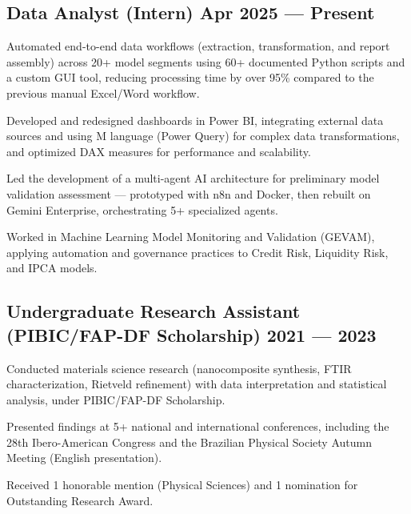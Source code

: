 \justifying

\subsection{{Data Analyst (Intern)} \hfill Apr 2025 --- Present}
\vspace{0.5em}
\begin{zitemize}
\setlength{\itemsep}{0.6em}
    \item Automated end-to-end data workflows (extraction, transformation, and report assembly) across 20+ model segments using 60+ documented Python scripts and a custom GUI tool, reducing processing time by over 95\% compared to the previous manual Excel/Word workflow.
    \item Developed and redesigned dashboards in Power BI, integrating external data sources and using M language (Power Query) for complex data transformations, and optimized DAX measures for performance and scalability.
    \item Led the development of a multi-agent AI architecture for preliminary model validation assessment — prototyped with n8n and Docker, then rebuilt on Gemini Enterprise, orchestrating 5+ specialized agents.
    \item Worked in Machine Learning Model Monitoring and Validation (GEVAM), applying automation and governance practices to Credit Risk, Liquidity Risk, and IPCA models.
    \vspace{1em}
\end{zitemize}
\subsection{Undergraduate Research Assistant (PIBIC/FAP-DF Scholarship) \hfill 2021 --- 2023}
\begin{zitemize}
    \setlength{\itemsep}{0.6em}
    \item Conducted materials science research (nanocomposite synthesis, FTIR characterization, Rietveld refinement) with data interpretation and statistical analysis, under PIBIC/FAP-DF Scholarship.
    \item Presented findings at 5+ national and international conferences, including the 28th Ibero-American Congress and the Brazilian Physical Society Autumn Meeting (English presentation).
    \item Received 1 honorable mention (Physical Sciences) and 1 nomination for Outstanding Research Award.
\end{zitemize}

